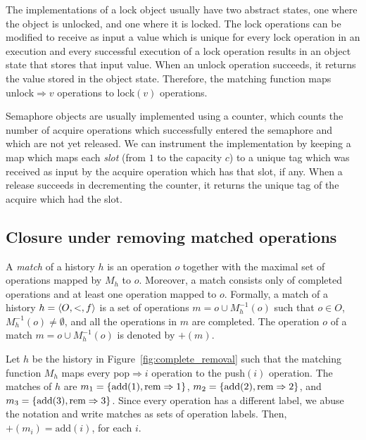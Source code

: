 \begin{example}[Locks]

  The implementations of a lock object usually have two abstract states, one
  where the object is unlocked, and one where it is locked. The lock operations
  can be modified to receive as input a value which is unique for every lock
  operation in an execution and every successful execution of a lock operation
  results in an object state that stores that input value. When an unlock
  operation succeeds, it returns the value stored in the object state.
  Therefore, the matching function maps unlock$\Rightarrow v$ operations to
  lock$(v)$ operations.

\end{example}

\begin{example}[Semaphores]

  Semaphore objects are usually implemented using a counter, which counts the
  number of acquire operations which successfully entered the semaphore and
  which are not yet released. We can instrument the implementation by keeping a
  map which maps each \emph{slot} (from $1$ to the capacity $c$) to a unique
  tag which was received as input by the acquire operation which has that slot,
  if any. When a release succeeds in decrementing the counter, it returns the
  unique tag of the acquire which had the slot.

\end{example}

\subsection{Closure under removing matched operations}

A \emph{match} of a history $h$ is an operation $o$ together with the maximal 
set of operations mapped by $M_h$ to $o$. 
Moreover, a match consists only of 
completed operations and at least one operation mapped to $o$. Formally, a match of a 
history $h={\langle{O,<,f}\rangle}$ is a set of operations $m=o\cup M^{-1}_h(o)$ such 
that $o\in O$, $M^{-1}_h(o)\neq \emptyset$, and all the operations in $m$
are completed. The operation $o$ of a match $m=o\cup M^{-1}_h(o)$ 
is denoted by $+(m)$.

\begin{example}

  Let $h$ be the history in Figure~\ref{fig:complete_removal} such that the
  matching function $M_h$ maps every pop$\Rightarrow i$ operation to the
  push$(i)$ operation. The matches of $h$ are $m_1 = {\{  \text{add}(1),
  \text{rem}\Rightarrow 1  \}}$, $m_2 = {\{  \text{add}(2),
  \text{rem}\Rightarrow2  \}}$, and $m_3 = {\{  \text{add}(3),
  \text{rem}\Rightarrow 3  \}}$. Since every operation has a different label, we
  abuse the notation and write matches as sets of operation labels. Then,
  $+(m_i) = \text{add}(i)$, for each $i$.

\end{example}

